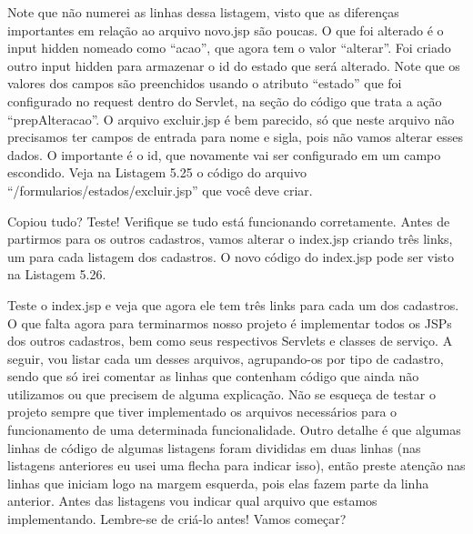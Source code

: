 
Note que não numerei as linhas dessa listagem, visto que as diferenças importantes em relação ao arquivo novo.jsp são poucas. O que foi alterado é o input hidden nomeado como ``acao'', que agora tem o valor ``alterar''. Foi criado outro input hidden para armazenar o id do estado que será alterado. Note que os valores dos campos são preenchidos usando o atributo ``estado'' que foi configurado no request dentro do Servlet, na seção do código que trata a ação ``prepAlteracao''.
O arquivo excluir.jsp é bem parecido, só que neste arquivo não precisamos ter campos de entrada para nome e sigla, pois não vamos alterar esses dados. O importante é o id, que novamente vai ser configurado em um campo escondido. Veja na Listagem 5.25 o código do arquivo ``/formularios/estados/excluir.jsp'' que você deve criar.


Copiou tudo? Teste! Verifique se tudo está funcionando corretamente. Antes de partirmos para os outros cadastros, vamos alterar o index.jsp criando três links, um para cada listagem dos cadastros. O novo código do index.jsp pode ser visto na Listagem 5.26.


Teste o index.jsp e veja que agora ele tem três links para cada um dos cadastros. O que falta agora para terminarmos nosso projeto é implementar todos os JSPs dos outros cadastros, bem como seus respectivos Servlets e classes de serviço. A seguir, vou listar cada um desses arquivos, agrupando-os por tipo de cadastro, sendo que só irei comentar as linhas que contenham código que ainda não utilizamos ou que precisem de alguma explicação. Não se esqueça de testar o projeto sempre que tiver implementado os arquivos necessários para o funcionamento de uma determinada funcionalidade. Outro detalhe é que algumas linhas de código de algumas listagens foram divididas em duas linhas (nas listagens anteriores eu usei uma flecha para indicar isso), então preste atenção nas linhas que iniciam logo na margem esquerda, pois elas fazem parte da linha anterior. Antes das listagens vou indicar qual arquivo que estamos implementando. Lembre-se de criá-lo antes! Vamos começar?

